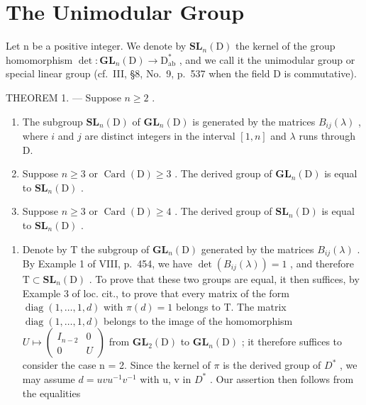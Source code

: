 \section{The Unimodular Group}

Let n be a positive integer. We denote by \(\mathbf{SL}_{n}(\mathrm{D})\) the kernel of the group homomorphism \(\det: \mathbf{GL}_{n}(\mathrm{D}) \to \mathrm{D}_{\mathrm{ab}}^{*}\) , and we call it the unimodular group or special linear group (cf.~III, §8, No.~9, p.~537 when the field D is commutative).

THEOREM 1. --- Suppose \(n \geqslant 2\) .

\begin{enumerate}
\def\labelenumi{\alph{enumi})}
\item
  The subgroup \(\mathbf{SL}_n(\mathrm{D})\) of \(\mathbf{GL}_n(\mathrm{D})\) is generated by the matrices \(B_{ij}(\lambda)\) , where \(i\) and \(j\) are distinct integers in the interval \([1,n]\) and \(\lambda\) runs through D.
\item
  Suppose \(n \geqslant 3\) or \(\operatorname{Card}(\mathrm{D}) \geqslant 3\) . The derived group of \(\mathbf{GL}_n(\mathrm{D})\) is equal to \(\mathbf{SL}_n(\mathrm{D})\) .
\item
  Suppose \(n \geqslant 3\) or \(\operatorname{Card}(\mathrm{D}) \geqslant 4\) . The derived group of \(\mathbf{SL}_n(\mathrm{D})\) is equal to \(\mathbf{SL}_n(\mathrm{D})\) .
\end{enumerate}

\begin{enumerate}
\def\labelenumi{\Alph{enumi})}
\tightlist
\item
  Denote by T the subgroup of \(\mathbf{GL}_{n}(\mathrm{D})\) generated by the matrices \(B_{ij}(\lambda)\) . By Example 1 of VIII, p.~454, we have \(\det(B_{ij}(\lambda)) = 1\) , and therefore \(\mathrm{T} \subset \mathbf{SL}_{n}(\mathrm{D})\) . To prove that these two groups are equal, it then suffices, by Example 3 of loc. cit., to prove that every matrix of the form \(\operatorname{diag}(1, \ldots, 1, d)\) with \(\pi(d) = 1\) belongs to T. The matrix \(\operatorname{diag}(1, \ldots, 1, d)\) belongs to the image of the homomorphism \(U \mapsto \begin{pmatrix} I_{n-2} & 0 \\ 0 & U \end{pmatrix}\) from \(\mathbf{GL}_{2}(\mathrm{D})\) to \(\mathbf{GL}_{n}(\mathrm{D})\) ; it therefore suffices to consider the case n = 2. Since the kernel of \(\pi\) is the derived group of \(D^{*}\) , we may assume \(d = uvu^{-1}v^{-1}\) with u, v in \(D^{*}\) . Our assertion then follows from the equalities
\end{enumerate}

